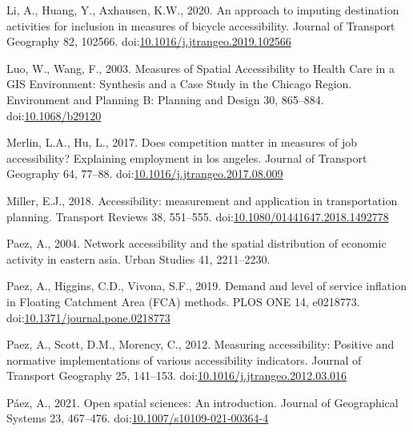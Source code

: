 \documentclass[]{elsarticle} %
\newlength{\cslhangindent}
\newlength{\cslentryspacingunit} %
\newenvironment{CSLReferences}[2] %
 {%
  \setlength{\parindent}{0pt}
  \ifodd #1
  \let\oldpar\par
  \def\par{\hangindent=\cslhangindent\oldpar}
  \fi
  \setlength{\parskip}{#2\cslentryspacingunit}
 }%
 {}
\begin{document}
\begin{CSLReferences}{1}{0}
\leavevmode{}%
Li, A., Huang, Y., Axhausen, K.W., 2020. An approach to imputing
destination activities for inclusion in measures of bicycle
accessibility. Journal of Transport Geography 82, 102566.
doi:\href{https://doi.org/10.1016/j.jtrangeo.2019.102566}{10.1016/j.jtrangeo.2019.102566}

\leavevmode{}%
Luo, W., Wang, F., 2003. Measures of Spatial Accessibility to Health
Care in a GIS Environment: Synthesis and a Case Study in the Chicago
Region. Environment and Planning B: Planning and Design 30, 865--884.
doi:\href{https://doi.org/10.1068/b29120}{10.1068/b29120}

\leavevmode{}%
Merlin, L.A., Hu, L., 2017. Does competition matter in measures of job
accessibility? Explaining employment in los angeles. Journal of
Transport Geography 64, 77--88.
doi:\href{https://doi.org/10.1016/j.jtrangeo.2017.08.009}{10.1016/j.jtrangeo.2017.08.009}

\leavevmode{}%
Miller, E.J., 2018. Accessibility: measurement and application in
transportation planning. Transport Reviews 38, 551--555.
doi:\href{https://doi.org/10.1080/01441647.2018.1492778}{10.1080/01441647.2018.1492778}

\leavevmode{}%
Paez, A., 2004. Network accessibility and the spatial distribution of
economic activity in eastern asia. Urban Studies 41, 2211--2230.

\leavevmode{}%
Paez, A., Higgins, C.D., Vivona, S.F., 2019. Demand and level of service
inflation in Floating Catchment Area (FCA) methods. PLOS ONE 14,
e0218773.
doi:\href{https://doi.org/10.1371/journal.pone.0218773}{10.1371/journal.pone.0218773}

\leavevmode{}%
Paez, A., Scott, D.M., Morency, C., 2012. Measuring accessibility:
Positive and normative implementations of various accessibility
indicators. Journal of Transport Geography 25, 141--153.
doi:\href{https://doi.org/10.1016/j.jtrangeo.2012.03.016}{10.1016/j.jtrangeo.2012.03.016}

\leavevmode{}%
Páez, A., 2021. Open spatial sciences: An introduction. Journal of
Geographical Systems 23, 467--476.
doi:\href{https://doi.org/10.1007/s10109-021-00364-4}{10.1007/s10109-021-00364-4}


\end{CSLReferences}
\end{document}
